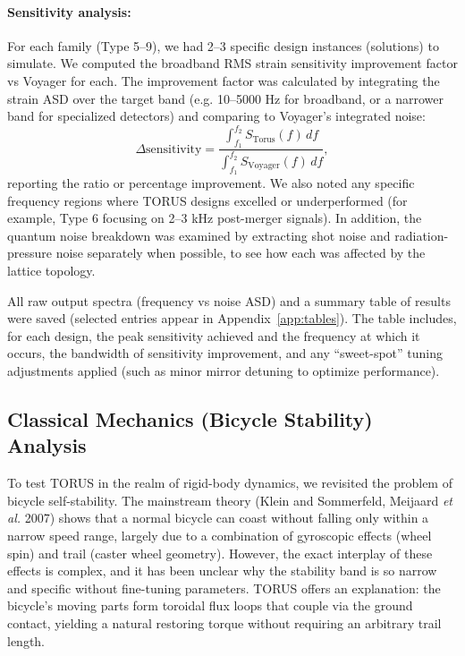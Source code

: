 \documentclass[12pt]{article}
\begin{document}
\paragraph{Sensitivity analysis:} For each family (Type 5–9), we had 2–3 specific design instances (solutions) to simulate. We computed the broadband RMS strain sensitivity improvement factor vs Voyager for each. The improvement factor was calculated by integrating the strain ASD over the target band (e.g. 10–5000 Hz for broadband, or a narrower band for specialized detectors) and comparing to Voyager’s integrated noise:
\[ \Delta \text{sensitivity} = \frac{\int_{f_1}^{f_2} S_{\text{Torus}}(f)\,df}{\int_{f_1}^{f_2} S_{\text{Voyager}}(f)\,df}, \] 
reporting the ratio or percentage improvement. We also noted any specific frequency regions where TORUS designs excelled or underperformed (for example, Type 6 focusing on 2–3 kHz post-merger signals). In addition, the quantum noise breakdown was examined by extracting shot noise and radiation-pressure noise separately when possible, to see how each was affected by the lattice topology.

All raw output spectra (frequency vs noise ASD) and a summary table of results were saved (selected entries appear in Appendix~\ref{app:tables}). The table includes, for each design, the peak sensitivity achieved and the frequency at which it occurs, the bandwidth of sensitivity improvement, and any “sweet-spot” tuning adjustments applied (such as minor mirror detuning to optimize performance).

\subsection{Classical Mechanics (Bicycle Stability) Analysis}\label{sec:methods_bike}
To test TORUS in the realm of rigid-body dynamics, we revisited the problem of bicycle self-stability. The mainstream theory (Klein and Sommerfeld, Meijaard \emph{et al.} 2007) shows that a normal bicycle can coast without falling only within a narrow speed range, largely due to a combination of gyroscopic effects (wheel spin) and trail (caster wheel geometry). However, the exact interplay of these effects is complex, and it has been unclear why the stability band is so narrow and specific without fine-tuning parameters. TORUS offers an explanation: the bicycle’s moving parts form toroidal flux loops that couple via the ground contact, yielding a natural restoring torque without requiring an arbitrary trail length.
\end{document}
